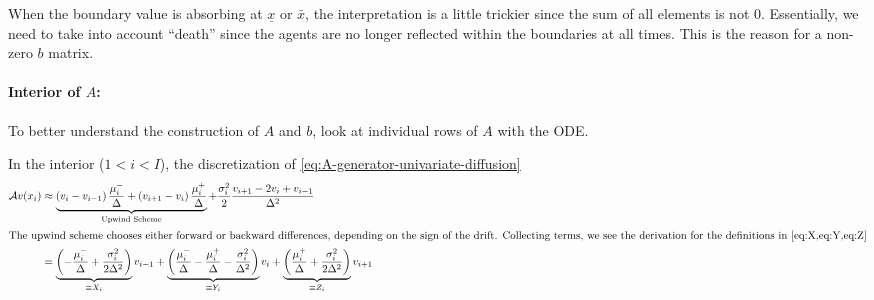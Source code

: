 \documentclass[11pt]{etk-article}
\begin{document}
When the boundary value is absorbing at $\underline{x}$ or $\bar{x}$, the interpretation is a little trickier since the sum of all elements is not $0$.  Essentially, we need to take into account ``death'' since the agents are no longer reflected within the boundaries at all times.  This is the reason for a non-zero $b$ matrix.


\paragraph{Interior of $A$:}
To better understand the construction of $A$ and $b$, look at individual rows of $A$ with the ODE.

In the interior ($1 < i < I$), the discretization of \cref{eq:A-generator-univariate-diffusion}
\begin{align}
\mathcal{A} v(x_i) &\approx \underbrace{\left(v_i-v_{i-1}\right)\frac{\mu_i^{-}}{\Delta}+ \left(v_{i+1}-v_i\right)\frac{\mu_i^{+}}{\Delta}}_{\text{Upwind Scheme}}  + \frac{\sigma_i^2}{2} \frac{v_{i+1} - 2 v_i + v_{i-1}}{\Delta^2}\label{eq:A-generator-univariate-diffusion-interior}\\
\intertext{The upwind scheme chooses either forward or backward differences, depending on the sign of the drift.  Collecting terms, we see the derivation for the definitions in \cref{eq:X,eq:Y,eq:Z}}
&= \underbrace{\left(-\frac{\mu_i^{-}}{\Delta} +\frac{\sigma_i^2}{2 \Delta^2}\right)}_{\equiv X_i}v_{i-1} + \underbrace{\left(\frac{\mu_i^{-}}{\Delta} - \frac{\mu_i^{+}}{\Delta}-\frac{\sigma_i^2}{\Delta^2}\right)}_{\equiv Y_i}v_i + \underbrace{\left(\frac{\mu_i^{+}}{\Delta} + \frac{\sigma_i^2}{2 \Delta^2}\right)}_{\equiv Z_i}v_{i+1}\label{eq:A-collected-interior}
\end{align}
\end{document}
